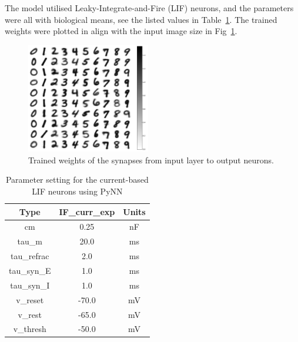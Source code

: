The model utilised Leaky-Integrate-and-Fire (LIF) neurons, and the parameters were all with biological means, see the listed values in Table~\ref{tbl:pynnSetting}.
The trained weights were plotted in align with the input image size in Fig~\ref{Fig:weight}.
\begin{figure}[hbt!]
	\centering
	\includegraphics[width=0.48\textwidth]{images/weight_r.pdf}
	\caption{Trained weights of the synapses from input layer to output neurons.}
	\label{Fig:weight}
\end{figure}  

\begin{table}[hbbp]
\centering
\caption{\label{tbl:pynnSetting}Parameter setting for the current-based LIF neurons using PyNN}
\begin{tabular}{c|c|c}
\hline
Type & IF\_curr\_exp & Units\\
\hline
cm & 0.25 & nF	\\
tau\_m & 20.0 & ms\\
tau\_refrac & 2.0 & ms\\
tau\_syn\_E & 1.0 & ms\\
tau\_syn\_I & 1.0 & ms\\
v\_reset & -70.0 & mV\\
v\_rest & -65.0 & mV\\
v\_thresh & -50.0 & mV\\
\hline
\end{tabular}
\end{table}

